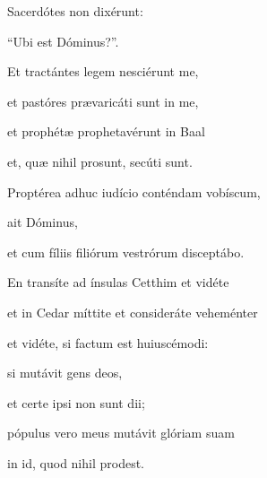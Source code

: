 {\noindent Sacerdótes non dixérunt:

\noindent “Ubi est Dóminus?”.

\noindent Et tractántes legem nesciérunt me,

\noindent et pastóres prævaricáti sunt in me,

\noindent et prophétæ prophetavérunt in Baal

\noindent et, quæ nihil prosunt, secúti sunt.

\noindent Proptérea adhuc iudício conténdam vobíscum,

\noindent ait Dóminus,

\noindent et cum fíliis filiórum vestrórum disceptábo.

\noindent En transíte ad ínsulas Cetthim et vidéte

\noindent et in Cedar míttite et consideráte veheménter

\noindent et vidéte, si factum est huiuscémodi:

\noindent si mutávit gens deos,

\noindent et certe ipsi non sunt dii;

\noindent pópulus vero meus mutávit glóriam suam

\noindent in id, quod nihil prodest.}
\newcommand{\responsoriumi}{\pars{Responsorium 1.} \scriptura{\Rbardot{} Ier. 14, 19.20 \Vbardot{} Bar. 2, 12; \textbf{H417}}

\vspace{-5mm}

\responsorium{VIII}{temporalia/resp-sustinuimuspacemetnonvenit-CROCHU.gtex}{}

\rubrica{vel ad libitum:}

\vspace{3mm}

\pars{Responsorium 1.} \scriptura{\Rbardot{} Mic. 6, 3; \textbf{H161}}

\vspace{-5mm}

\responsorium{VII}{temporalia/resp-populemeusquidfeci-CROCHU.gtex}{}}
